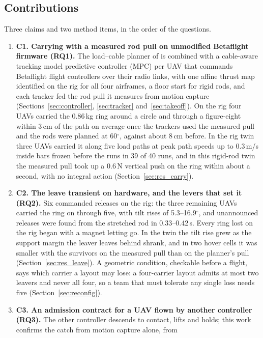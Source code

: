 \subsection{Contributions}
\label{sec:contributions}

Three claims and two method items, in the order of the questions.
\begin{enumerate}
    \item \textbf{C1. Carrying with a measured rod pull on unmodified Betaflight firmware (RQ1).} The
    load--cable planner of \cite{tudelft} is combined with a cable-aware tracking model predictive controller
    (MPC) per UAV that commands Betaflight flight controllers over their radio links, with one affine thrust map
    identified on the rig for all four airframes, a floor start for rigid rods, and each tracker fed the rod pull
    it measures from motion capture (Sections~\ref{sec:controller}, \ref{sec:tracker} and~\ref{sec:takeoff}). On
    the rig four UAVs carried the 0.86\,kg ring around a circle and through a figure-eight within 3\,cm of the
    path on average once the trackers used the measured pull and the rods were planned at 60$^\circ$, against
    about 8\,cm before. In the rig twin three UAVs carried it along five load paths at peak path speeds up to
    0.3\,m/s inside bars frozen before the runs in 39 of 40 runs, and in this rigid-rod twin the measured pull took up a 0.6\,N
    vertical push on the ring within about a second, with no integral action (Section~\ref{sec:res_carry}).
    \item \textbf{C2. The leave transient on hardware, and the levers that set it (RQ2).} Six commanded
    releases on the rig: the three remaining UAVs carried the ring on through five, with tilt rises of
    5.3--16.9$^\circ$, and unannounced releases were found from the stretched rod in 0.33--0.42\,s. Every ring
    lost on the rig began with a magnet letting go. In the twin the tilt rise grew as the support margin the leaver
    leaves behind shrank, and in two hover cells it was smaller with the survivors on the measured pull than on the
    planner's pull (Section~\ref{sec:res_leave}). A geometric condition, checkable
    before a flight, says which carrier a layout may lose: a four-carrier layout admits at most two leavers and
    never all four, so a team that must tolerate any single loss needs five (Section~\ref{sec:reconfig}).
    \item \textbf{C3. An admission contract for a UAV flown by another controller (RQ3).} The other
    controller descends to contact, lifts and holds; this work confirms the catch from motion capture alone, from

\end{enumerate}
